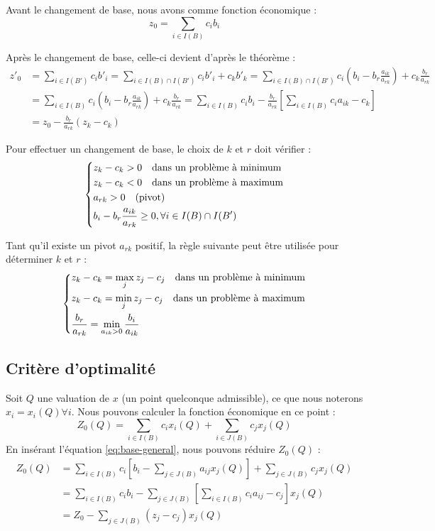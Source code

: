 \documentclass[a4paper]{report}
\theoremstyle{definition}
\theoremstyle{remark}
\theoremstyle{plain}
\begin{document}
Avant le changement de base, nous avons comme fonction économique :
\[ z_0 = \sum_{i \in I(B)}{c_i b_i} \]

Après le changement de base, celle-ci devient d'après le théorème :
\begin{equation*}\begin{split}
z'_0 & = \sum_{i \in I(B')}{c_i b'_i} = \sum_{i \in I(B) \cap I(B')}{c_i b'_i} + c_k b'_k = \sum_{i \in I(B) \cap I(B')}{c_i \left( b_i - b_r \frac{a_{ik}}{a_{rk}} \right)} + c_k \frac{b_r}{a_{rk}} \\
& = \sum_{i \in I(B)}{c_i \left( b_i - b_r \frac{a_{ik}}{a_{rk}} \right)} + c_k \frac{b_r}{a_{rk}} = \sum_{i \in I(B)}{c_i b_i} - \frac{b_r}{a_{rk}} \left[ \sum_{i \in I(B)}{c_i a_{ik} - c_k} \right] \\
& = z_0 - \frac{b_r}{a_{rk}} (z_k - c_k)
\end{split}\end{equation*}

Pour effectuer un changement de base, le choix de $k$ et $r$ doit vérifier :
\[\begin{dcases}
	z_k - c_k > 0 \quad \text{dans un problème à minimum} \\
    z_k - c_k < 0 \quad \text{dans un problème à maximum} \\
    a_{rk} > 0 \quad \text{(pivot)} \\
    b_i - b_r \frac{a_{ik}}{a_{rk}} \geq 0, \forall i \in I(B) \cap I(B')
\end{dcases}\]

Tant qu'il existe un pivot $a_{rk}$ positif, la règle suivante peut être utilisée pour déterminer $k$ et $r$ :
\[\begin{dcases}
	z_k - c_k = \max_{j}{z_j - c_j} \quad \text{dans un problème à minimum} \\
    z_k - c_k = \min_{j}{z_j - c_j} \quad \text{dans un problème à maximum} \\
    \frac{b_r}{a_{rk}} = \min_{a_{ik}>0}{\frac{b_i}{a_{ik}}}
\end{dcases}\]

\subsection{Critère d'optimalité}
Soit $Q$ une valuation de $x$ (un point quelconque admissible), ce que nous noterons $x_i = x_i(Q) \forall i$. Nous pouvons calculer la fonction économique en ce point :
\[Z_0(Q) = \sum_{i \in I(B)}{c_i x_i(Q)} + \sum_{i \in J(B)}{c_j x_j(Q)} \]
En insérant l'équation \ref{eq:base-general}, nous pouvons réduire $Z_0(Q)$ :
\begin{equation}\begin{split}
Z_0(Q) & = \sum_{i \in I(B)}{c_i \left[ b_i - \sum_{j \in J(B)}{a_{ij}x_j(Q)} \right]} + \sum_{j \in J(B)}{c_j x_j(Q)} \\
& = \sum_{i \in I(B)}{c_i b_i - \sum_{j \in J(B)}{\left[ \sum_{i \in I(B)}{c_i a_{ij} - c_j} \right]} x_j(Q)} \\
& = Z_0 - \sum_{j \in J(B)}{(z_j - c_j)x_j(Q)}
\end{split}\end{equation}
\end{document}
